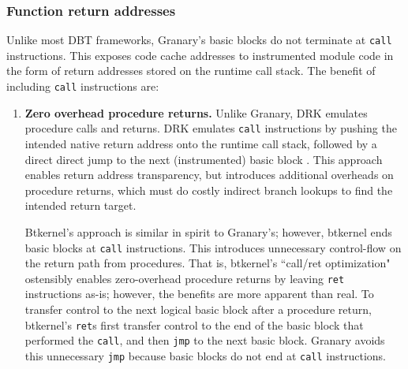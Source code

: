 \documentclass[preprint]{sigplanconf}
\begin{document}
\subsubsection{Function return addresses}\label{sec:return_address_transparency}
Unlike most DBT frameworks, Granary's basic blocks do not terminate at \texttt{call} instructions. This exposes code cache addresses to instrumented module code in the form of return addresses stored on the runtime call stack. The benefit of including \texttt{call} instructions are: \begin{enumerate}

	\item {\bf Zero overhead procedure returns.} Unlike Granary, DRK emulates procedure calls and returns. DRK emulates \texttt{call} instructions by pushing the intended native return address onto the runtime call stack, followed by a direct direct jump to the next (instrumented) basic block \cite{DRK}. This approach enables return address transparency, but introduces additional overheads on procedure returns, which must do costly indirect branch lookups to find the intended return target. 

Btkernel's approach is similar in spirit to Granary's; however, btkernel ends basic blocks at \texttt{call} instructions. This introduces unnecessary control-flow on the return path from procedures. That is, btkernel's ``call/ret optimization" ostensibly enables zero-overhead procedure returns by leaving \texttt{ret} instructions as-is; however, the benefits are more apparent than real. To transfer control to the next logical basic block after a procedure return, btkernel's \texttt{ret}s first transfer control to the end of the basic block that performed the \texttt{call}, and then \texttt{jmp} to the next basic block. Granary avoids this unnecessary \texttt{jmp} because basic blocks do not end at \texttt{call} instructions.
	

\end{enumerate}
\end{document}
